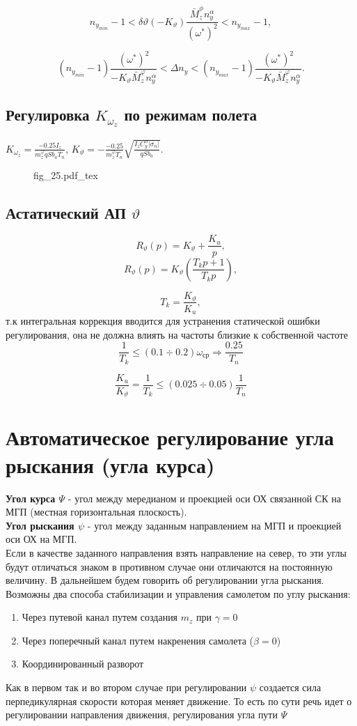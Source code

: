 \documentclass{article}
\begin{document}
\[
	n_{{y}_{min}} - 1<  \delta \vartheta (- K_\vartheta)\frac{\bar{M}_z^\phi n_y^\alpha}{(\omega^*)^2} < n_{{y}_{max}} - 1,
\]

\[
	(n_{{y}_{min}} - 1)\frac{(\omega^*)^2}{-K_{\vartheta}\bar{M}_z^\varphi n_y^\alpha}< \Delta n_y< (n_{{y}_{max}} - 1) \frac{(\omega^*)^2}{-K_{\vartheta}\bar{M}_z^\varphi n_y^\alpha}.
\]

\subsection{Регулировка \texorpdfstring{$K_{\omega_z}$}{Lg} по режимам полета}
$K_{\omega_z}  =\frac{-0.25 I_z}{m_z^\varphi q S b_a T_n}$, $K_{\vartheta}  = - \frac{-0.25}{m_z^\varphi T_n} \sqrt{\frac{I_z C_y^\alpha |\sigma_n|}{qSb_a}}$.
\begin{figure}[H]
	\centering
	{fig_25.pdf_tex}
\end{figure}

\subsection{Астатический АП \texorpdfstring{$\vartheta$}{Lg}}
\[
	R_{\vartheta}(p) = K_\vartheta + \frac{K_u}{p},
\]
\[
	R_{\vartheta}(p) = K_\vartheta(\frac{T_k p  + 1 }{T_k p}),
\]

\[
	T_k = \frac{K_\vartheta}{K_u},
\]
т.к интегральная коррекция вводится для устранения статической ошибки регулирования, она не должна влиять на частоты близкие к собственной частоте 
\[
	\frac{1}{T_k} \leq (0.1 \div 0.2) \omega_\text{ср} \Rightarrow \frac{0.25}{T_n}
\]

\[
	\frac{K_u}{K_\vartheta} =  \frac{1}{T_k} \leq (0.025 \div 0.05) \frac{1}{T_n}
\]
\section{Автоматическое регулирование угла рыскания (угла курса)}
\textbf{Угол курса $\Psi$} - угол между мередианом и проекцией оси ОХ связанной СК на МГП (местная горизонтальная плоскость).\\
\textbf{Угол рыскания $\psi$} - угол между заданным направлением на МГП и проекцией оси ОХ на МГП.\\
Если в качестве заданного направления взять направление на север, то эти углы будут отличаться знаком в противном случае они отличаются на постоянную величину. В дальнейшем будем говорить об регулировании угла рыскания. Возможны два способа стабилизации и управления самолетом по углу рыскания:
\begin{enumerate}
	\item Через путевой канал путем создания $m_z$ при $\gamma = 0$
	\item Через поперечный канал путем накренения самолета ($\beta = 0$)
	\item Координированный разворот
\end{enumerate}
Как в первом так и во втором случае при регулировании $\psi$ создается сила перпедикулярная скорости которая меняет движение. То есть по сути речь идет о регулировании направления движения, регулирования угла пути $\Psi$
\end{document}
